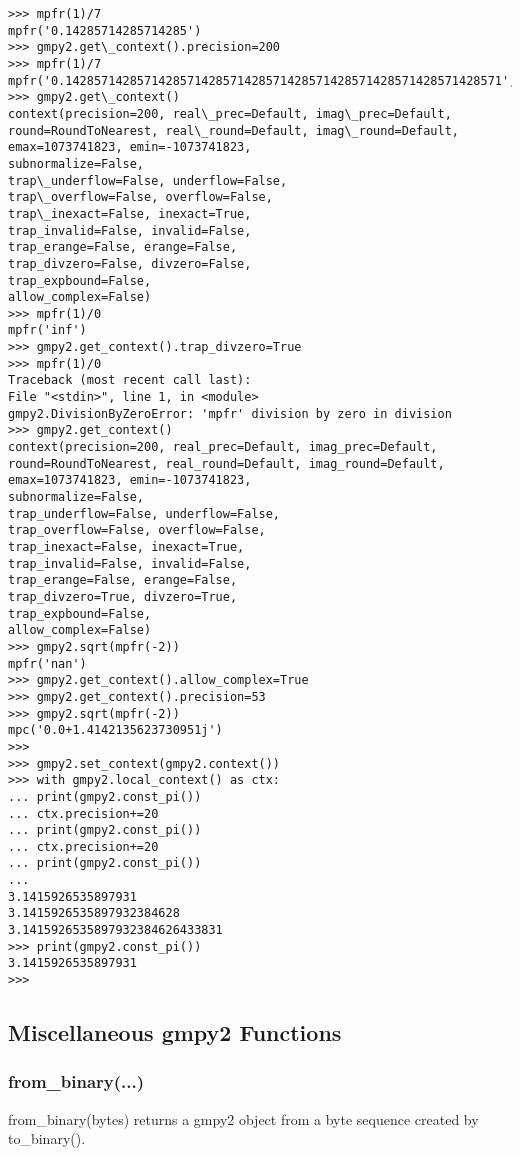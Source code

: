 \begin{lstlisting}
>>> mpfr(1)/7
mpfr('0.14285714285714285')
>>> gmpy2.get\_context().precision=200
>>> mpfr(1)/7
mpfr('0.1428571428571428571428571428571428571428571428571428571428571',200)
>>> gmpy2.get\_context()
context(precision=200, real\_prec=Default, imag\_prec=Default,
round=RoundToNearest, real\_round=Default, imag\_round=Default,
emax=1073741823, emin=-1073741823,
subnormalize=False,
trap\_underflow=False, underflow=False,
trap\_overflow=False, overflow=False,
trap\_inexact=False, inexact=True,
trap_invalid=False, invalid=False,
trap_erange=False, erange=False,
trap_divzero=False, divzero=False,
trap_expbound=False,
allow_complex=False)
>>> mpfr(1)/0
mpfr('inf')
>>> gmpy2.get_context().trap_divzero=True
>>> mpfr(1)/0
Traceback (most recent call last):
File "<stdin>", line 1, in <module>
gmpy2.DivisionByZeroError: 'mpfr' division by zero in division
>>> gmpy2.get_context()
context(precision=200, real_prec=Default, imag_prec=Default,
round=RoundToNearest, real_round=Default, imag_round=Default,
emax=1073741823, emin=-1073741823,
subnormalize=False,
trap_underflow=False, underflow=False,
trap_overflow=False, overflow=False,
trap_inexact=False, inexact=True,
trap_invalid=False, invalid=False,
trap_erange=False, erange=False,
trap_divzero=True, divzero=True,
trap_expbound=False,
allow_complex=False)
>>> gmpy2.sqrt(mpfr(-2))
mpfr('nan')
>>> gmpy2.get_context().allow_complex=True
>>> gmpy2.get_context().precision=53
>>> gmpy2.sqrt(mpfr(-2))
mpc('0.0+1.4142135623730951j')
>>>
>>> gmpy2.set_context(gmpy2.context())
>>> with gmpy2.local_context() as ctx:
... print(gmpy2.const_pi())
... ctx.precision+=20
... print(gmpy2.const_pi())
... ctx.precision+=20
... print(gmpy2.const_pi())
...
3.1415926535897931
3.1415926535897932384628
3.1415926535897932384626433831
>>> print(gmpy2.const_pi())
3.1415926535897931
>>>
\end{lstlisting}

\subsection{Miscellaneous gmpy2 Functions}

\subsubsection{from\_binary(...)}

from\_binary(bytes) returns a gmpy2 object from a byte sequence created by to\_binary().

